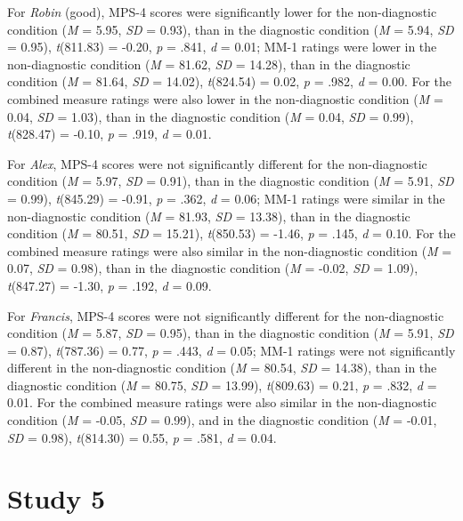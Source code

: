 \documentclass[
  american,
  man,floatsintext]{apa7}
\begin{document}
For \emph{Robin} (good), MPS-4 scores were significantly lower for the non-diagnostic condition (\emph{M} = 5.95, \emph{SD} = 0.93), than in the diagnostic condition (\emph{M} = 5.94, \emph{SD} = 0.95), \emph{t}(811.83) = -0.20, \emph{p} = .841, \emph{d} = 0.01; MM-1 ratings were lower in the non-diagnostic condition (\emph{M} = 81.62, \emph{SD} = 14.28), than in the diagnostic condition (\emph{M} = 81.64, \emph{SD} = 14.02), \emph{t}(824.54) = 0.02, \emph{p} = .982, \emph{d} = 0.00. For the combined measure ratings were also lower in the non-diagnostic condition (\emph{M} = 0.04, \emph{SD} = 1.03), than in the diagnostic condition (\emph{M} = 0.04, \emph{SD} = 0.99), \emph{t}(828.47) = -0.10, \emph{p} = .919, \emph{d} = 0.01.

For \emph{Alex}, MPS-4 scores were not significantly different for the non-diagnostic condition (\emph{M} = 5.97, \emph{SD} = 0.91), than in the diagnostic condition (\emph{M} = 5.91, \emph{SD} = 0.99), \emph{t}(845.29) = -0.91, \emph{p} = .362, \emph{d} = 0.06; MM-1 ratings were similar in the non-diagnostic condition (\emph{M} = 81.93, \emph{SD} = 13.38), than in the diagnostic condition (\emph{M} = 80.51, \emph{SD} = 15.21), \emph{t}(850.53) = -1.46, \emph{p} = .145, \emph{d} = 0.10. For the combined measure ratings were also similar in the non-diagnostic condition (\emph{M} = 0.07, \emph{SD} = 0.98), than in the diagnostic condition (\emph{M} = -0.02, \emph{SD} = 1.09), \emph{t}(847.27) = -1.30, \emph{p} = .192, \emph{d} = 0.09.

For \emph{Francis}, MPS-4 scores were not significantly different for the non-diagnostic condition (\emph{M} = 5.87, \emph{SD} = 0.95), than in the diagnostic condition (\emph{M} = 5.91, \emph{SD} = 0.87), \emph{t}(787.36) = 0.77, \emph{p} = .443, \emph{d} = 0.05; MM-1 ratings were not significantly different in the non-diagnostic condition (\emph{M} = 80.54, \emph{SD} = 14.38), than in the diagnostic condition (\emph{M} = 80.75, \emph{SD} = 13.99), \emph{t}(809.63) = 0.21, \emph{p} = .832, \emph{d} = 0.01. For the combined measure ratings were also similar in the non-diagnostic condition (\emph{M} = -0.05, \emph{SD} = 0.99), and in the diagnostic condition (\emph{M} = -0.01, \emph{SD} = 0.98), \emph{t}(814.30) = 0.55, \emph{p} = .581, \emph{d} = 0.04.

\hypertarget{study-5}{%
\section{Study 5}\label{study-5}}
\end{document}
